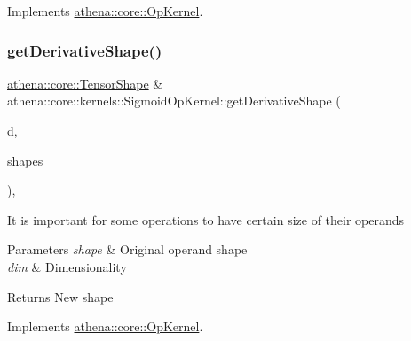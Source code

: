 Implements \mbox{\hyperlink{classathena_1_1core_1_1_op_kernel_ad500db1afc5a7c10acff8ecb8f1bee4d}{athena\+::core\+::\+Op\+Kernel}}.

\mbox{\label{classathena_1_1core_1_1kernels_1_1_sigmoid_op_kernel_a0ea18b43eb9355d7a855202898ff09fc}} 
\subsubsection{\texorpdfstring{get\+Derivative\+Shape()}{getDerivativeShape()}}
{\footnotesize\ttfamily \mbox{\hyperlink{classathena_1_1core_1_1_tensor_shape}{athena\+::core\+::\+Tensor\+Shape}} \& athena\+::core\+::kernels\+::\+Sigmoid\+Op\+Kernel\+::get\+Derivative\+Shape (\begin{DoxyParamCaption}\item[{int}]{d,  }\item[{std\+::vector$<$ \mbox{\hyperlink{classathena_1_1core_1_1_tensor_shape}{athena\+::core\+::\+Tensor\+Shape}} $>$ \&}]{shapes }\end{DoxyParamCaption})\hspace{0.3cm}{\ttfamily [override]}, {\ttfamily [virtual]}}

It is important for some operations to have certain size of their operands 
\begin{DoxyParams}{Parameters}
{\em shape} & Original operand shape \\
\hline
{\em dim} & Dimensionality \\
\hline
\end{DoxyParams}
\begin{DoxyReturn}{Returns}
New shape 
\end{DoxyReturn}


Implements \mbox{\hyperlink{classathena_1_1core_1_1_op_kernel_ad95af6dd184ce7ee9182ec7ca54b6c4d}{athena\+::core\+::\+Op\+Kernel}}.

\mbox{\label{classathena_1_1core_1_1kernels_1_1_sigmoid_op_kernel_acb639510462e759a92747cec8c32358b}} 
